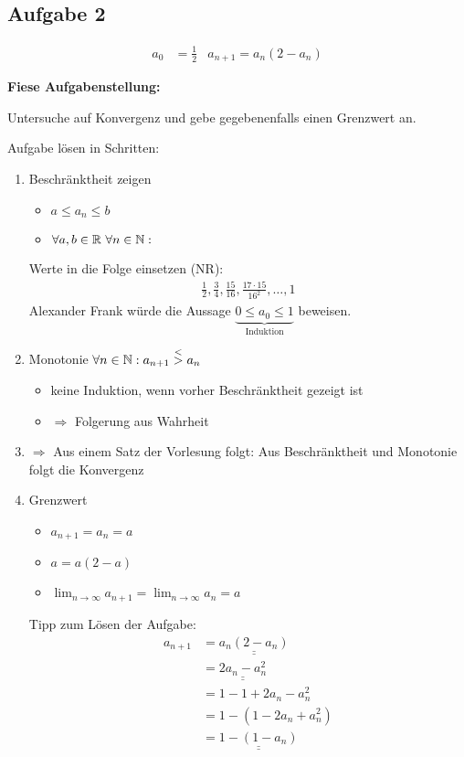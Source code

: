 \subsection{Aufgabe 2}

\begin{align*}
    a_0 &= \frac{1}{2} & a_{n+1} = a_n(2-a_n)
\end{align*}

\textbf{Fiese Aufgabenstellung:}
\begin{center}
    Untersuche auf Konvergenz und gebe gegebenenfalls einen Grenzwert an.
\end{center}
Aufgabe lösen in Schritten:
\begin{enumerate}[label=\arabic*)]
    \item Beschränktheit zeigen 
    \begin{itemize}
        \item $a \leq a_n \leq b$
        \item $\forall a, b \in \mathbb R \ \forall n \in \mathbb N:$
    \end{itemize}
    Werte in die Folge einsetzen (NR):
    \begin{align*}
        \frac{1}{2}, \frac{3}{4}, \frac{15}{16}, \frac{17 \cdot 15}{16^2}, \dots, 1
    \end{align*}
    Alexander Frank würde die Aussage $\underbrace{0 \leq a_0 \leq 1}_{\text{Induktion}}$ beweisen.
    \item Monotonie $\forall n \in \mathbb N: a_{n+1} \overset{<}{>} a_n$
    \begin{itemize}
        \item keine Induktion, wenn vorher Beschränktheit gezeigt ist
        \item $\Rightarrow$ Folgerung aus Wahrheit
    \end{itemize}
    \item $\Rightarrow$ Aus einem Satz der Vorlesung folgt: Aus Beschränktheit und Monotonie folgt die Konvergenz
    \item Grenzwert 
    \begin{itemize}
        \item $a_{n+1} = a_n = a$
        \item $a = a(2-a)$
        \item $\lim_{n \rightarrow \infty} a_{n+1} = \lim_{n \rightarrow \infty} a_n = a$
    \end{itemize}
    
    Tipp zum Lösen der Aufgabe:
    \newcommand{\db}[1]{\underline{\underline{#1}}}
    \begin{align*}
        a_{n+1} &= \db{a_n(2 - a_n)}\\
        &= \db{2a_n - a_n^2}\\
        &= 1 - 1 + 2a_n - a_n^2\\
        &= 1 - (1 - 2a_n + a_n^2)\\
        &= \db{1 - (1 - a_n)}
    \end{align*}
\end{enumerate}